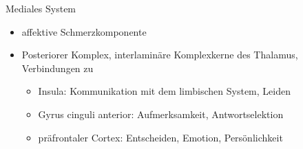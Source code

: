 \documentclass{beamer}
\begin{document}
\begin{frame}{Mediales System}
    
\begin{itemize}
\item
affektive Schmerzkomponente
\item
Posteriorer Komplex, interlaminäre Komplexkerne des Thalamus, Verbindungen zu 
\begin{itemize}
    \item 
    Insula: Kommunikation mit dem limbischen System, Leiden
    \item
Gyrus cinguli anterior: Aufmerksamkeit, Antwortselektion
\item
präfrontaler Cortex: Entscheiden, Emotion, Persönlichkeit
\end{itemize}


\end{itemize}
    

    
\end{frame}



\end{document}

